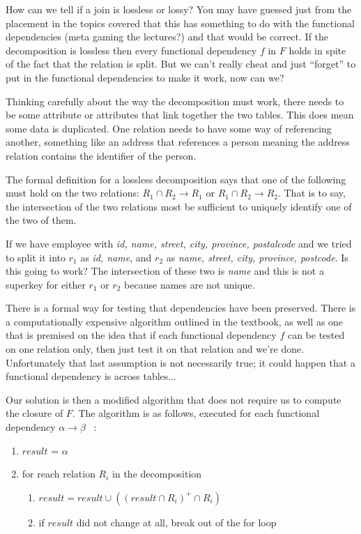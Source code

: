 How can we tell if a join is lossless or lossy? You may have guessed just from the placement in the topics covered that this has something to do with the functional dependencies (meta gaming the lectures?) and that would be correct. If the decomposition is lossless then every functional dependency $f$ in $F$ holds in spite of the fact that the relation is split. But we can't really cheat and just ``forget'' to put in the functional dependencies to make it work, now can we?

Thinking carefully about the way the decomposition must work, there needs to be some attribute or attributes that link together the two tables. This does mean some data is duplicated. One relation needs to have some way of referencing another, something like an address that references a person meaning the address relation contains the identifier of the person. 

The formal definition for a lossless decomposition says that one of the following must hold on the two relations: $R_{1} \cap R_{2} \rightarrow R_{1}$ or  $R_{1} \cap R_{2} \rightarrow R_{2}$. That is to say, the intersection of the two relations most be sufficient to uniquely identify one of the two of them. 

If we have employee with \textit{id, name, street, city, province, postalcode} and we tried to split it into $r_{1}$ as \textit{id, name}, and $r_{2}$ as \textit{name, street, city, province, postcode}. Is this going to work? The intersection of these two is \textit{name} and this is not a superkey for either $r_{1}$ or $r_{2}$ because names are not unique.

There is a formal way for testing that dependencies have been preserved. There is a computationally expensive algorithm outlined in the textbook, as well as one that is premised on the idea that if each functional dependency $f$ can be tested on one relation only, then just test it on that relation and we're done. Unfortunately that last assumption is not necessarily true; it could happen that a functional dependency is across tables...

Our solution is then a modified algorithm that does not require us to compute the closure of $F$. The algorithm is as follows, executed for each functional dependency $\alpha \rightarrow \beta$ ~\cite{dsc}:


\begin{enumerate}
	\item $result$ = $\alpha$
	\item for reach relation $R_{i}$ in the decomposition
	\begin{enumerate}
		\item $result = result \cup (  (result \cap R_{i})^{+} \cap R_{i} )$
	    \item if $result$ did not change at all, break out of the for loop
	    \end{enumerate}
\end{enumerate}


